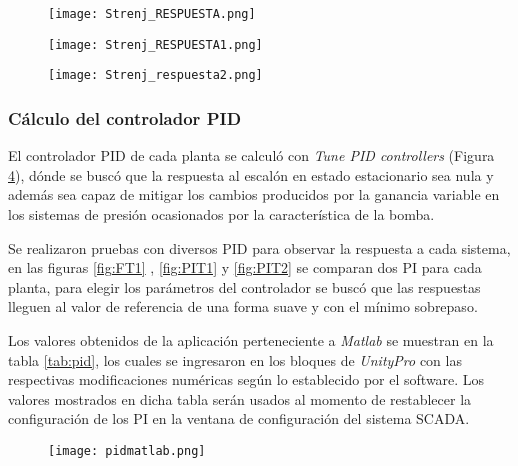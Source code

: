 {\begin{comment}
 dónde el motor no era esforzado a calentarse ni la bomba era sobreexigida

escalones ubicados en la parte central del rango útil estipulado .

 además obtener un control apropiado al sistema: algo no muy rapido ni muy lento
\end{comment}


\begin{figure}[h!]
	\centering
	\texttt{[image: Strenj\_RESPUESTA.png]}
	\label{fig:FT01}
\end{figure}
\begin{figure}[h!]
	\centering
	\texttt{[image: Strenj\_RESPUESTA1.png]}
	\label{fig:PIT01}
\end{figure}




\begin{figure}[h!]
	\centering
	\texttt{[image: Strenj\_respuesta2.png]}
	\label{fig:PIT02}
\end{figure}




\clearpage

\subsubsection{Cálculo del controlador PID}
El controlador PID de cada planta se calculó con \textit{Tune PID controllers} (Figura \ref{fig:PIDcontr}), dónde se buscó que la respuesta al escalón en estado estacionario sea nula y además sea capaz de mitigar los cambios producidos por la ganancia variable en los sistemas de presión ocasionados por la característica de la bomba. 

Se realizaron pruebas con diversos PID para observar la respuesta a cada sistema, en las figuras \ref{fig:FT1} , \ref{fig:PIT1} y \ref{fig:PIT2} se comparan dos PI para cada planta, para elegir los parámetros del controlador se buscó que las respuestas lleguen al valor de referencia de una forma suave y con el mínimo sobrepaso.

Los valores obtenidos de la aplicación perteneciente a \textit{Matlab} se muestran en la tabla \ref{tab:pid}, los cuales se ingresaron en los bloques de \textit{UnityPro} con las respectivas modificaciones numéricas según lo establecido por el software. Los valores mostrados en dicha tabla serán usados al momento de restablecer la configuración de los PI en la ventana de configuración del sistema SCADA.
\begin{figure}[h!]
	\centering
	\texttt{[image: pidmatlab.png]}
	\label{fig:PIDcontr}
\end{figure}



}
